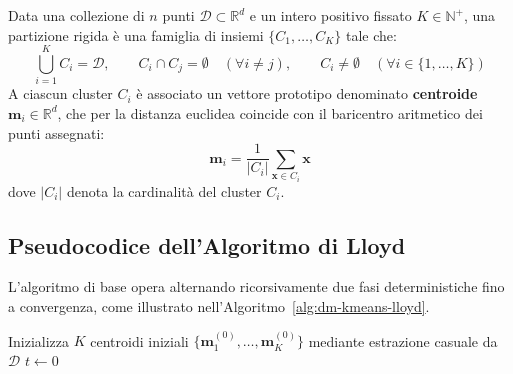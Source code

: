 \begin{definition}
Data una collezione di $n$ punti $\mathcal{D} \subset \mathbb{R}^d$ e un intero positivo fissato $K \in \mathbb{N}^+$, una partizione rigida è una famiglia di insiemi $\{C_1, \dots, C_K\}$ tale che:
\begin{equation}
    \bigcup_{i=1}^K C_i = \mathcal{D}, \qquad C_i \cap C_j = \emptyset \quad (\forall i \ne j), \qquad C_i \ne \emptyset \quad (\forall i \in \{1, \dots, K\})
\end{equation}
A ciascun cluster $C_i$ è associato un vettore prototipo denominato \textbf{centroide} $\mathbf{m}_i \in \mathbb{R}^d$, che per la distanza euclidea coincide con il baricentro aritmetico dei punti assegnati:
\begin{equation}
    \mathbf{m}_i = \frac{1}{|C_i|} \sum_{\mathbf{x} \in C_i} \mathbf{x}
    \label{eq:dm-centroid-definition}
\end{equation}
dove $|C_i|$ denota la cardinalità del cluster $C_i$.
\end{definition}

\subsection{Pseudocodice dell'Algoritmo di Lloyd}

L'algoritmo di base opera alternando ricorsivamente due fasi deterministiche fino a convergenza, come illustrato nell'Algoritmo~\ref{alg:dm-kmeans-lloyd}.

\begin{algorithm}[htbp]
\SetAlgoLined
{}
Inizializza $K$ centroidi iniziali $\{\mathbf{m}_1^{(0)}, \dots, \mathbf{m}_K^{(0)}\}$ mediante estrazione casuale da $\mathcal{D}$\;
$t \leftarrow 0$\;
\caption{Algoritmo standard di K-Means (Lloyd).}
\label{alg:dm-kmeans-lloyd}
\end{algorithm}


